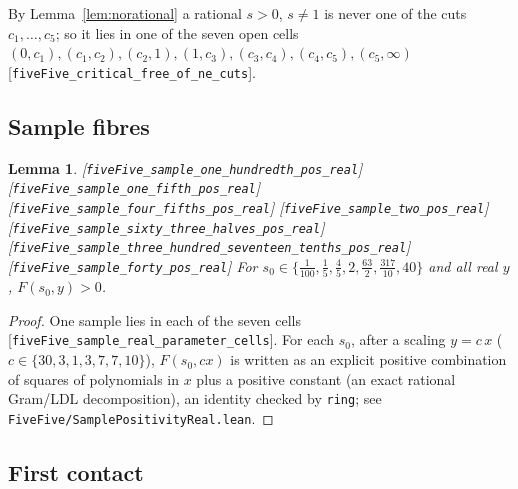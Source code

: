 \documentclass[10pt]{article}
\newtheorem{lemma}[theorem]{Lemma}
\theoremstyle{definition}
\theoremstyle{remark}
\newcommand{\leanref}[1]{{\scriptsize\textup{[\texttt{#1}]}}\allowbreak}
\newcommand{\leanfile}[1]{\texttt{\small #1}}
\begin{document}
By Lemma~\ref{lem:norational} a rational $s>0$, $s\ne1$ is never one of the
cuts $c_1,\dots,c_5$; so it lies in one of the seven open cells
$(0,c_1),(c_1,c_2),(c_2,1),(1,c_3),(c_3,c_4),(c_4,c_5),(c_5,\infty)$
\leanref{five\allowbreak Five\_\allowbreak critical\_\allowbreak free\_\allowbreak of\_\allowbreak ne\_\allowbreak cuts}.

\subsection{Sample fibres}

\begin{lemma}\label{lem:samples}
\leanref{five\allowbreak Five\_\allowbreak sample\_\allowbreak one\_\allowbreak hundredth\_\allowbreak pos\_\allowbreak real} \leanref{five\allowbreak Five\_\allowbreak sample\_\allowbreak one\_\allowbreak fifth\_\allowbreak pos\_\allowbreak real} \leanref{five\allowbreak Five\_\allowbreak sample\_\allowbreak four\_\allowbreak fifths\_\allowbreak pos\_\allowbreak real} \leanref{five\allowbreak Five\_\allowbreak sample\_\allowbreak two\_\allowbreak pos\_\allowbreak real} \leanref{five\allowbreak Five\_\allowbreak sample\_\allowbreak sixty\_\allowbreak three\_\allowbreak halves\_\allowbreak pos\_\allowbreak real} \leanref{five\allowbreak Five\_\allowbreak sample\_\allowbreak three\_\allowbreak hundred\_\allowbreak seventeen\_\allowbreak tenths\_\allowbreak pos\_\allowbreak real} \leanref{five\allowbreak Five\_\allowbreak sample\_\allowbreak forty\_\allowbreak pos\_\allowbreak real}
For $s_0\in\{\tfrac1{100},\tfrac15,\tfrac45,2,\tfrac{63}{2},\tfrac{317}{10},40\}$
and all real $y$, $F(s_0,y)>0$.
\end{lemma}
\begin{proof}
One sample lies in each of the seven cells
\leanref{five\allowbreak Five\_\allowbreak sample\_\allowbreak real\_\allowbreak parameter\_\allowbreak cells}.  For each $s_0$, after a
scaling $y=c\,x$ ($c\in\{30,3,1,3,7,7,10\}$), $F(s_0,cx)$ is written as an
explicit positive combination of squares of polynomials in $x$ plus a positive
constant (an exact rational Gram/LDL decomposition), an identity checked by
\texttt{ring}; see \leanfile{Five\allowbreak Five/\allowbreak Sample\allowbreak Positivity\allowbreak Real.\allowbreak lean}.
\end{proof}

\subsection{First contact}
\end{document}
